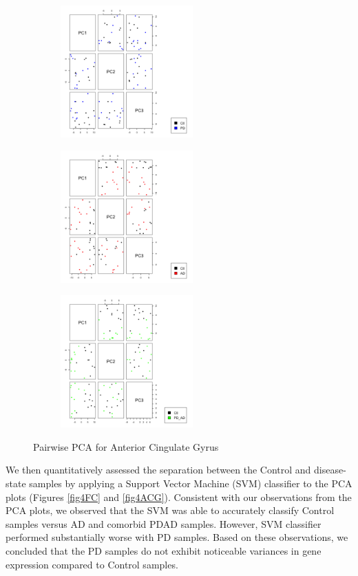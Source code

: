\begin{figure}
\begin{subfigure}[b]{0.33\linewidth}
\centering
\includegraphics[width=2.0in]{./Figures/fig3/Fig3a-Anterior-Cingulate-Gyrus_CtlvsPD.png}
\end{subfigure}%
\begin{subfigure}[b]{0.33\linewidth}
\centering
\includegraphics[width=2.0in]{./Figures/fig3/Fig3b-Anterior-Cingulate-Gyrus_CtlvsAD.png}
\end{subfigure}%
\begin{subfigure}[b]{0.33\linewidth}
\centering
\includegraphics[width=2.0in]{./Figures/fig3/Fig3c-Anterior-Cingulate-Gyrus_CtlvsADPD.png}
\end{subfigure}
\caption{\label{fig3ACG} Pairwise PCA for Anterior Cingulate Gyrus}

\end{figure}

We then quantitatively assessed the separation between the Control and disease-state samples by applying a Support Vector Machine (SVM) classifier to the PCA plots (Figures \ref{fig4FC} and \ref{fig4ACG}). Consistent with our observations from the PCA plots, we observed that the SVM was able to accurately classify Control samples versus AD and comorbid PDAD samples. However, SVM classifier performed substantially worse with PD samples. Based on these observations, we concluded that the PD samples do not exhibit noticeable variances in gene expression compared to Control samples.\\

